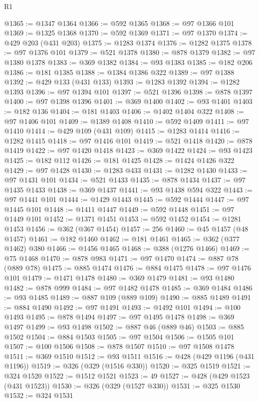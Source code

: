 \begin{lexlean}{R1}
\begin{coremodule}
@1365 := @1347 @1364
@1366 := @592 @1365
@1368 := @97 @1366 @101
@1369 := @1325 @1368
@1370 := @592 @1369
@1371 := @97 @1370
@1374 := @429 @203 (@431 @203)
@1375 := @1283 @1374
@1376 := @1282 @1375
@1378 := @97 @1376 @101
@1379 := @521 @1378
@1380 := @878 @1379
@1382 := @97 @1380 @1378
@1383 := @369 @1382
@1384 := @93 @1383
@1385 := @182 @206
@1386 := @181 @1385
@1388 := @1384 @1386 @322
@1389 := @97 @1388
@1392 := @429 @133 (@431 @133)
@1393 := @1283 @1392
@1394 := @1282 @1393
@1396 := @97 @1394 @101
@1397 := @521 @1396
@1398 := @878 @1397
@1400 := @97 @1398 @1396
@1401 := @369 @1400
@1402 := @93 @1401
@1403 := @182 @136
@1404 := @181 @1403
@1406 := @1402 @1404 @322
@1408 := @97 @1406 @101
@1409 := @1389 @1408
@1410 := @592 @1409
@1411 := @97 @1410
@1414 := @429 @109 (@431 @109)
@1415 := @1283 @1414
@1416 := @1282 @1415
@1418 := @97 @1416 @101
@1419 := @521 @1418
@1420 := @878 @1419
@1422 := @97 @1420 @1418
@1423 := @369 @1422
@1424 := @93 @1423
@1425 := @182 @112
@1426 := @181 @1425
@1428 := @1424 @1426 @322
@1429 := @97 @1428
@1430 := @1283 @433
@1431 := @1282 @1430
@1433 := @97 @1431 @101
@1434 := @521 @1433
@1435 := @878 @1434
@1437 := @97 @1435 @1433
@1438 := @369 @1437
@1441 := @93 @1438 @594 @322
@1443 := @97 @1441 @101
@1444 := @1429 @1443
@1445 := @592 @1444
@1447 := @97 @1445 @101
@1448 := @1411 @1447
@1449 := @592 @1448
@1451 := @97 @1449 @101
@1452 := @1371 @1451
@1453 := @592 @1452
@1454 := @1281 @1453
@1456 := @362 (@367 @1454)
@1457 := 256
@1460 := @45 @1457 (@48 @1457)
@1461 := @182 @1460
@1462 := @181 @1461
@1465 := @362 (@377 @1462) @380
@1466 := @1456 @1465
@1468 := @388 (@1276 @1466)
@1469 := @75 @1468
@1470 := @878 @983
@1471 := @97 @1470
@1474 := @887 @78 (@889 @78)
@1475 := @885 @1474
@1476 := @884 @1475
@1478 := @97 @1476 @101
@1479 := @1471 @1478
@1480 := @369 @1479
@1481 := @93 @1480
@1482 := @878 @999
@1484 := @97 @1482 @1478
@1485 := @369 @1484
@1486 := @93 @1485
@1489 := @887 @109 (@889 @109)
@1490 := @885 @1489
@1491 := @884 @1490
@1492 := @97 @1491
@1493 := @1492 @101
@1494 := @100 @1493
@1495 := @878 @1494
@1497 := @97 @1495 @1478
@1498 := @369 @1497
@1499 := @93 @1498
@1502 := @887 @46 (@889 @46)
@1503 := @885 @1502
@1504 := @884 @1503
@1505 := @97 @1504
@1506 := @1505 @101
@1507 := @100 @1506
@1508 := @878 @1507
@1510 := @97 @1508 @1478
@1511 := @369 @1510
@1512 := @93 @1511
@1516 := @428 (@429 @1196 (@431 @1196))
@1519 := @326 (@329 (@1516 @330))
@1520 := @325 @1519
@1521 := @324 @1520
@1522 := @1512 @1521
@1523 := 49
@1527 := @428 (@429 @1523 (@431 @1523))
@1530 := @326 (@329 (@1527 @330))
@1531 := @325 @1530
@1532 := @324 @1531

\end{coremodule}
\end{lexlean}
